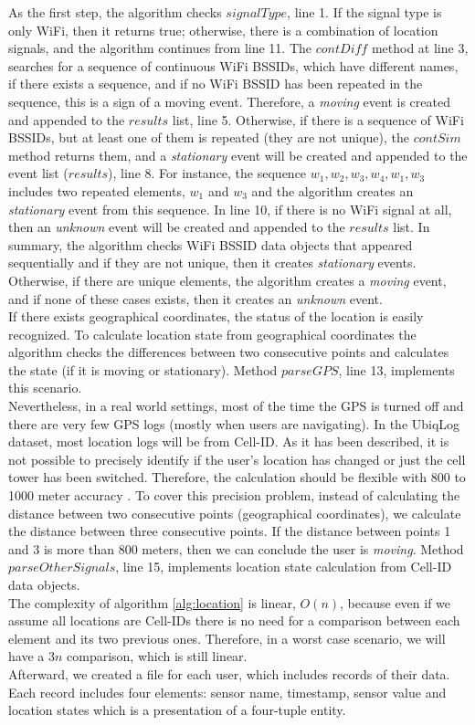 \documentclass{sig-alternate}
\begin{document}
As the first step, the algorithm checks $signalType$, line 1. If the signal type is only WiFi, then it returns true; otherwise, there is a combination of location signals, and the algorithm continues from line 11. The $contDiff$ method at line 3, searches for a sequence of continuous WiFi BSSIDs, which have different names, if there exists a sequence, and if no WiFi BSSID has been repeated in the sequence, this is a sign of a moving event. Therefore, a \emph{moving} event is created and appended to the $results$ list, line 5. Otherwise, if there is a sequence of WiFi BSSIDs, but at least one of them is repeated (they are not unique), the $contSim$ method returns them, and a \emph{stationary} event will be created and appended to the event list ($results$), line 8. For instance, the sequence ${w_1,w_2,w_3,w_4,w_1,w_3}$ includes two repeated elements, $w_1$ and $w_3$ and the algorithm creates an \emph{stationary} event from this sequence. In line 10, if there is no WiFi signal at all, then an \emph{unknown} event will be created and appended to the $results$ list. In summary, the algorithm checks WiFi BSSID data objects that appeared sequentially and if they are not unique, then it creates \emph{stationary} events. Otherwise, if there are unique elements, the algorithm creates a \emph{moving} event, and if none of these cases exists, then it creates an \emph{unknown} event. \\
If there exists geographical coordinates, the status of the location is easily recognized. To calculate location state from geographical coordinates the algorithm checks the differences between two consecutive points and calculates the state (if it is moving or stationary). Method $parseGPS$, line 13, implements this scenario. \\
Nevertheless, in a real world settings, most of the time the GPS is turned off and there are very few GPS logs (mostly when users are navigating). In the UbiqLog dataset, most location logs will be from Cell-ID. As it has been described, it is not possible to precisely identify if the user's location has changed or just the cell tower has been switched. Therefore, the calculation should be flexible with 800 to 1000 meter accuracy \cite{discgps}. To cover this precision problem, instead of calculating the distance between two consecutive points (geographical coordinates), we calculate the distance between three consecutive points. If the distance between points 1 and 3 is more than 800 meters, then we can conclude the user is \emph{moving}. Method $parseOtherSignals$, line 15, implements location state calculation from Cell-ID data objects.\\ 
The complexity of algorithm \ref{alg:location} is linear, $O(n)$, because even if we assume all locations are Cell-IDs there is no need for a comparison between each element and its two previous ones. Therefore, in a worst case scenario, we will have a $3n$ comparison, which is still linear.\\
Afterward, we created a file for each user, which includes records of their data. Each record includes four elements: sensor name, timestamp, sensor value and location states which is a presentation of a four-tuple entity.
\end{document}
